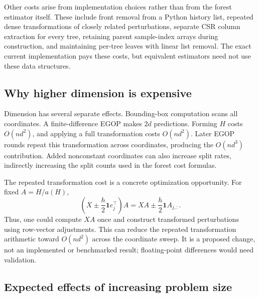 \documentclass[11pt]{article}
\begin{document}
Other costs arise from implementation choices rather than from the forest estimator itself. These include front removal from a Python history list, repeated dense transformations of closely related perturbations, separate CSR column extraction for every tree, retaining parent sample-index arrays during construction, and maintaining per-tree leaves with linear list removal. The exact current implementation pays these costs, but equivalent estimators need not use these data structures.

\subsection{Why higher dimension is expensive}

Dimension has several separate effects. Bounding-box computation scans all coordinates. A finite-difference EGOP makes $2d$ predictions. Forming $H$ costs $O(nd^2)$, and applying a full transformation costs $O(nd^2)$. Later EGOP rounds repeat this transformation across coordinates, producing the $O(nd^3)$ contribution. Added nonconstant coordinates can also increase split rates, indirectly increasing the split counts used in the forest cost formulas.

The repeated transformation cost is a concrete optimization opportunity. For fixed $A=H/a(H)$,
\begin{equation}
\left(X\pm\frac h2\mathbf{1}e_j^\top\right)A
=XA\pm\frac h2\mathbf{1}A_{j,:}.
\end{equation}
Thus, one could compute $XA$ once and construct transformed perturbations using row-vector adjustments. This can reduce the repeated transformation arithmetic toward $O(nd^2)$ across the coordinate sweep. It is a proposed change, not an implemented or benchmarked result; floating-point differences would need validation.

\subsection{Expected effects of increasing problem size}
\end{document}
